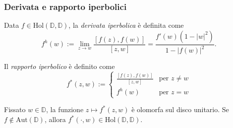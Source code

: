 \begin{frame}
  \frametitle{Derivata e rapporto iperbolici}
  \begin{defn}
    Data $f \in \text{Hol}(\mathbb{D},\mathbb{D})$, la \textit{derivata iperbolica} è definita come
    $$f^h(w):=\lim_{z \longrightarrow w} \frac{[f(z),f(w)]}{[z,w]}=\frac{f'(w)(1-|w|^2)}{1-|f(w)|^2}.$$
  \end{defn}
  \pause
  \begin{defn}
    Il \textit{rapporto iperbolico} è definito come
    $$f^*(z,w):=\begin{cases}
      \frac{[f(z),f(w)]}{[z,w]} & \mbox{per }z\not=w \\
      f^h(w) & \mbox{per }z=w
    \end{cases}$$
  \end{defn}
  \pause
  Fissato $w \in \mathbb{D}$, la funzione $z \longmapsto f^*(z,w)$ è olomorfa sul disco unitario. Se $f \not\in \text{Aut}(\mathbb{D})$, allora $f^*(\cdot,w) \in \text{Hol}(\mathbb{D},\mathbb{D})$.
\end{frame}
